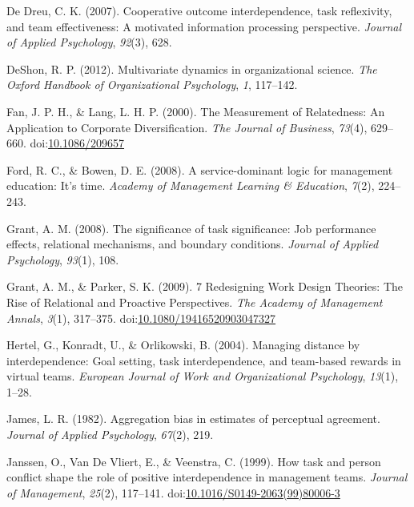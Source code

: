 \documentclass[english,,man]{apa6}
\theoremstyle{definition}
\theoremstyle{definition}
\theoremstyle{definition}
\theoremstyle{remark}
\begin{document}
\leavevmode\hypertarget{ref-de_dreu_cooperative_2007}{}%
De Dreu, C. K. (2007). Cooperative outcome interdependence, task
reflexivity, and team effectiveness: A motivated information processing
perspective. \emph{Journal of Applied Psychology}, \emph{92}(3), 628.

\leavevmode\hypertarget{ref-deshon_multivariate_2012}{}%
DeShon, R. P. (2012). Multivariate dynamics in organizational science.
\emph{The Oxford Handbook of Organizational Psychology}, \emph{1},
117--142.

\leavevmode\hypertarget{ref-fan_measurement_2000}{}%
Fan, J. P. H., \& Lang, L. H. P. (2000). The Measurement of Relatedness:
An Application to Corporate Diversification. \emph{The Journal of
Business}, \emph{73}(4), 629--660.
doi:\href{https://doi.org/10.1086/209657}{10.1086/209657}

\leavevmode\hypertarget{ref-ford_service-dominant_2008}{}%
Ford, R. C., \& Bowen, D. E. (2008). A service-dominant logic for
management education: It's time. \emph{Academy of Management Learning \&
Education}, \emph{7}(2), 224--243.

\leavevmode\hypertarget{ref-grant_significance_2008}{}%
Grant, A. M. (2008). The significance of task significance: Job
performance effects, relational mechanisms, and boundary conditions.
\emph{Journal of Applied Psychology}, \emph{93}(1), 108.

\leavevmode\hypertarget{ref-grant_7_2009}{}%
Grant, A. M., \& Parker, S. K. (2009). 7 Redesigning Work Design
Theories: The Rise of Relational and Proactive Perspectives. \emph{The
Academy of Management Annals}, \emph{3}(1), 317--375.
doi:\href{https://doi.org/10.1080/19416520903047327}{10.1080/19416520903047327}

\leavevmode\hypertarget{ref-hertel_managing_2004}{}%
Hertel, G., Konradt, U., \& Orlikowski, B. (2004). Managing distance by
interdependence: Goal setting, task interdependence, and team-based
rewards in virtual teams. \emph{European Journal of Work and
Organizational Psychology}, \emph{13}(1), 1--28.

\leavevmode\hypertarget{ref-james_aggregation_1982}{}%
James, L. R. (1982). Aggregation bias in estimates of perceptual
agreement. \emph{Journal of Applied Psychology}, \emph{67}(2), 219.

\leavevmode\hypertarget{ref-janssen_how_1999}{}%
Janssen, O., Van De Vliert, E., \& Veenstra, C. (1999). How task and
person conflict shape the role of positive interdependence in management
teams. \emph{Journal of Management}, \emph{25}(2), 117--141.
doi:\href{https://doi.org/10.1016/S0149-2063(99)80006-3}{10.1016/S0149-2063(99)80006-3}
\end{document}
